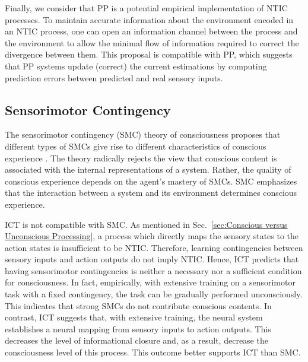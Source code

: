 \documentclass[utf8]{article}
\begin{document}
    		Finally, we consider that PP is a potential empirical implementation of NTIC processes. To maintain accurate information about the environment encoded in an NTIC process, one can open an information channel between the process and the environment to allow the minimal flow of information required to correct the divergence between them. This proposal is compatible with PP, which suggests that PP systems update (correct) the current estimations by computing prediction errors between predicted and real sensory inputs.


		\subsection{Sensorimotor Contingency}
			The sensorimotor contingency (SMC) theory of consciousness proposes that different types of SMCs give rise to different characteristics of conscious experience  \citep{o2001sensorimotor}. The theory radically rejects the view that conscious content is associated with the internal representations of a system. Rather, the quality of conscious experience depends on the agent’s mastery of SMCs. SMC emphasizes that the interaction between a system and its environment determines conscious experience.

    		
    		ICT is not compatible with SMC. As mentioned in Sec.~\ref{sec:Conscious versus Unconscious Processing}, a process which directly maps the sensory states to the action states is insufficient to be NTIC. Therefore, learning contingencies between sensory inputs and action outputs do not imply NTIC. Hence, ICT predicts that having sensorimotor contingencies is neither a necessary nor a sufficient condition for consciousness. In fact, empirically, with extensive training on a sensorimotor task with a fixed contingency, the task can be gradually performed unconsciously. This indicates that strong SMCs do not contribute conscious contents. In contrast, ICT suggests that, with extensive training, the neural system establishes a neural mapping from sensory inputs to action outputs. This decreases the level of informational closure and, as a result, decrease the consciousness level of this process. This outcome better supports ICT than SMC.
    		
\end{document}
